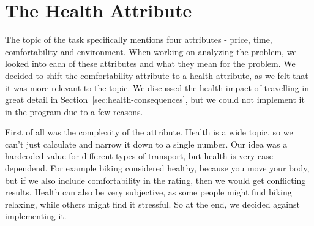 \section{The Health Attribute}\label{sec:health-attribute}

The topic of the task specifically mentions four attributes - price, time, comfortability and environment.
When working on analyzing the problem, we looked into each of these attributes and what they mean for the problem.
We decided to shift the comfortability attribute to a health attribute, as we felt that it was more relevant to the
topic.
We discussed the health impact of travelling in great detail in Section~\ref{sec:health-consequences}, but we could not
implement it in the program due to a few reasons.

First of all was the complexity of the attribute.
Health is a wide topic, so we can't just calculate and narrow it down to a single number.
Our idea was a hardcoded value for different types of transport, but health is very case dependend.
For example biking considered healthy, because you move your body, but if we also include comfortability in the rating,
then we would get conflicting results.
Health can also be very subjective, as some people might find biking relaxing, while others might find it stressful.
So at the end, we decided against implementing it.
